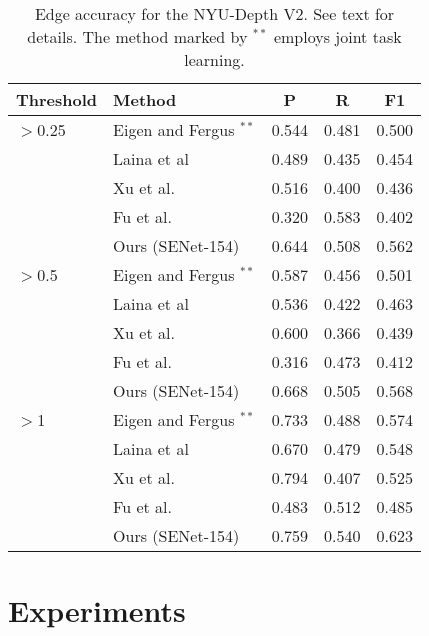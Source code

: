 \documentclass[10pt,twocolumn,letterpaper]{article}
\begin{document}
\setlength{\tabcolsep}{3.4pt}
\begin{table}[!t]
\begin{center}
\caption{Edge accuracy for the NYU-Depth V2. See text for details. The method marked by $^{**}$ employs joint task learning.
}\label{nyu_shape}
\begin{tabular}{|l|l|c|c|c|}
\hline
Threshold &Method&P & R &F1 \\
\hline\hline
$>$0.25 
&Eigen and Fergus \protect\cite{Eigen2015PredictingDS}$^{**}$ &0.544&0.481&0.500\\
&Laina et al \protect\cite{laina2016deeper}  &0.489 &0.435 &0.454 \\
&Xu et al. \cite{Xu2017MultiscaleCC} &0.516 &0.400 &0.436 \\
&Fu et al. \cite{fu2018deep} &0.320 &0.583 &0.402 \\ 
&Ours (SENet-154)   &0.644 &0.508 &0.562 \\
\hline
$>$0.5
&Eigen and Fergus \protect\cite{Eigen2015PredictingDS}$^{**}$ &0.587&0.456&0.501\\
&Laina et al \protect\cite{laina2016deeper}&0.536&0.422&0.463\\
&Xu et al. \cite{Xu2017MultiscaleCC} &0.600 &0.366 &0.439 \\
&Fu et al. \cite{fu2018deep} &0.316 &0.473 &0.412 \\
&Ours (SENet-154)       &0.668 &0.505 &0.568 \\
\hline
$>$1
&Eigen and Fergus \protect\cite{Eigen2015PredictingDS}$^{**}$ &0.733&0.488&0.574\\
&Laina et al \protect\cite{laina2016deeper}&0.670&0.479&0.548\\
&Xu et al. \cite{Xu2017MultiscaleCC} &0.794 &0.407 &0.525 \\
&Fu et al. \cite{fu2018deep} &0.483 &0.512 &0.485 \\
&Ours (SENet-154)        &0.759 &0.540 &0.623 \\
\hline
\end{tabular}
\end{center}
\end{table}
\setlength{\tabcolsep}{1.4pt}



\section{Experiments}
\end{document}

